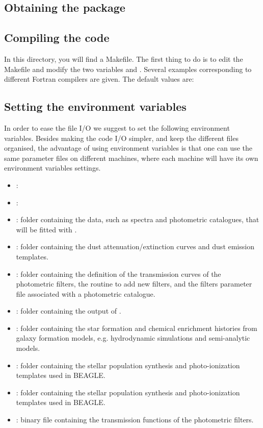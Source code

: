 \documentclass[a4paper,11pt,twoside]{article}
\begin{document}
\subsection{Obtaining the package}

\subsection{Compiling the code}

In this  directory, you will find a Makefile. The first thing
to do is to edit the Makefile and modify the two variables 
and . Several examples corresponding to different Fortran
compilers are given. The default values are:


\subsection{Setting the environment variables}

In order to ease the file I/O we suggest to set the following environment variables. Besides making the code I/O simpler, and keep the different files organised, the advantage of using environment variables is that one can use the same parameter files on different machines, where each machine will have its own environment variables settings.

\begin{itemize}
	\item {}: 
	\item {}:
	\item {}: folder containing the data, such as spectra and photometric
  catalogues, that will be fitted with \beagle.
	\item {}: folder containing the dust attenuation/extinction curves and dust emission
  templates.
	\item {}: folder containing the definition of the transmission curves of the
  photometric filters, the routine to add new filters, and the filters
parameter file associated with a photometric catalogue.
	\item {}: folder containing the output of \beagle.
	\item {}: folder containing the star formation and chemical enrichment histories
  from galaxy formation models, e.g. hydrodynamic simulations and semi-analytic
models.
	\item {}: folder containing the stellar population synthesis and photo-ionization
  templates used in BEAGLE.
  \item {}: folder containing the stellar population synthesis and photo-ionization
  templates used in BEAGLE.
  \item {}: binary file containing the transmission functions of the photometric filters. 

\end{itemize}
\end{document}
